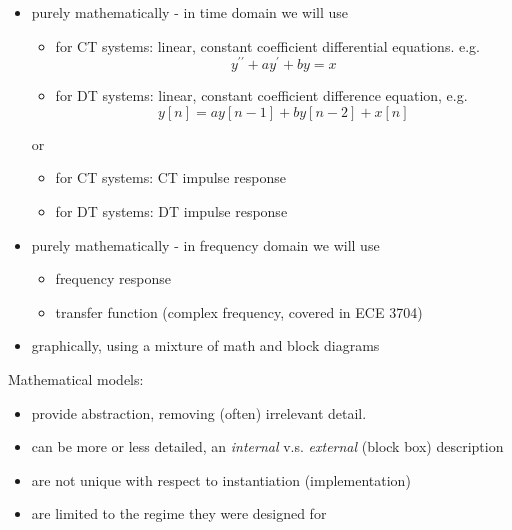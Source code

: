 \begin{itemize}
\item purely mathematically - in time domain we will use
  \begin{itemize}
  \item for CT systems: linear, constant coefficient differential equations. e.g.
    \[
    y^{\prime\prime} + ay^\prime + by = x
    \]
    
  \item for DT systems: linear, constant coefficient difference equation, e.g.
    \[
    y[n] = a y[n-1] + b y[n-2] + x[n]
    \]
  \end{itemize}
  or
  \begin{itemize}
  \item for CT systems: CT impulse response
  \item for DT systems: DT impulse response
  \end{itemize}
\item purely mathematically - in frequency domain we will use
  \begin{itemize}
  \item frequency response
  \item transfer function (complex frequency, covered in ECE 3704)
  \end{itemize}
\item graphically, using a mixture of math and block diagrams
\end{itemize}

Mathematical models:
\begin{itemize}
\item provide abstraction, removing (often) irrelevant detail.
\item can be more or less detailed, an {\it internal} v.s. {\it external} (block box) description
\item are not unique with respect to instantiation (implementation)
\item are limited to the regime they were designed for
\end{itemize}

